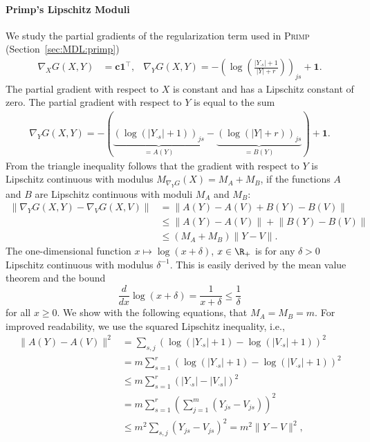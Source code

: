 \paragraph{Primp's Lipschitz Moduli}
We study the partial gradients of the regularization term used in \textsc{Primp} (Section~\ref{sec:MDL:primp})
\begin{align*}
\nabla_X G(X,Y)&=\mathbf{c1}^\top,&
\nabla_Y G(X,Y)=-\left(\log\left(\frac{\lvert Y_{\cdot s}\rvert +1}{\lvert Y\rvert +r}\right)\right)_{js}+\mathbf{1}.
\end{align*}
The partial gradient with respect to $X$ is constant and has a Lipschitz constant of zero. The partial gradient with respect to $Y$ is equal to the sum
\begin{align*}
\nabla_YG(X,Y)=-(\underbrace{(\log(\lvert Y_{\cdot s}\rvert +1))_{js}}_{=A(Y)}-\underbrace{(\log(\lvert Y\rvert +r))_{js}}_{=B(Y)})+\mathbf{1}.
\end{align*}
From the triangle inequality follows that the gradient with respect to $Y$ is Lipschitz continuous with modulus $M_{\nabla_YG}(X)=M_A+M_B$, if the functions $A$ and $B$ are Lipschitz continuous with moduli $M_A$ and $M_B$:
\begin{align*}
\lVert \nabla_YG(X,Y)-\nabla_VG(X,V)\rVert &=\lVert A(Y)-A(V)+B(Y)-B(V)\rVert \\
&\leq \lVert A(Y)-A(V)\rVert +\lVert B(Y)-B(V)\rVert \\
&\leq (M_A+M_B)\lVert Y-V\rVert .
\end{align*}
The one-dimensional function $x\mapsto\log(x+\delta)$, $x\in \R_+$ is for any $\delta>0$ Lipschitz continuous with modulus $\delta^{-1}$. This is easily derived by the mean value theorem and the bound 
\[\frac{d}{dx}\log(x+\delta)=\frac{1}{x+\delta}\leq \frac{1}{\delta}\]
for all $x\geq 0$. We show with the following equations, that $M_A=M_B=m$. For improved readability, we use the squared Lipschitz inequality, i.e.,
\begin{align}
\lVert A(Y)-A(V)\rVert ^2 &=\sum_{s,j}(\log(\lvert Y_{\cdot s}\rvert +1)-\log(\lvert V_{\cdot s}\rvert +1))^2\nonumber\\
&=m\sum_{s=1}^r(\log(\lvert Y_{\cdot s}\rvert +1)-\log(\lvert V_{\cdot s}\rvert +1))^2\nonumber \\
&\leq m\sum_{s=1}^r(\lvert Y_{\cdot s}\rvert -\lvert V_{\cdot s}\rvert )^2\label{eq:lipLog1}\\
&= m\sum_{s=1}^r\left(\sum_{j=1}^m(Y_{j s}-V_{j s})\right)^2\nonumber\\
&\leq m^2\sum_{s,j}(Y_{j s}-V_{j s})^2= m^2\lVert Y-V\rVert ^2,\label{eq:cauchySchw1}
\end{align}
